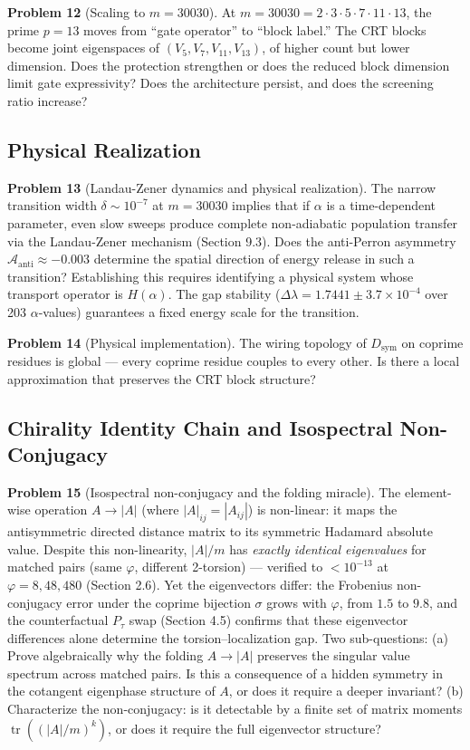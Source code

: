 \documentclass[11pt,letterpaper]{article}
\theoremstyle{definition}
\theoremstyle{remark}
\begin{document}
\textbf{Problem 12} (Scaling to $m = 30030$). At $m = 30030 = 2 \cdot 3 \cdot 5 \cdot 7 \cdot 11 \cdot 13$, the prime $p = 13$ moves from ``gate operator'' to ``block label.'' The CRT blocks become joint eigenspaces of $(V_5, V_7, V_{11}, V_{13})$, of higher count but lower dimension. Does the protection strengthen or does the reduced block dimension limit gate expressivity? Does the architecture persist, and does the screening ratio increase?

\subsection{Physical Realization}\label{physical-realization}

\textbf{Problem 13} (Landau-Zener dynamics and physical realization). The narrow transition width $\delta \sim 10^{-7}$ at $m = 30030$ implies that if $\alpha$ is a time-dependent parameter, even slow sweeps produce complete non-adiabatic population transfer via the Landau-Zener mechanism (Section 9.3). Does the anti-Perron asymmetry $\mathcal{A}_{\text{anti}} \approx -0.003$ determine the spatial direction of energy release in such a transition? Establishing this requires identifying a physical system whose transport operator is $H(\alpha)$. The gap stability ($\Delta\lambda = 1.7441 \pm 3.7 \times 10^{-4}$ over 203 $\alpha$-values) guarantees a fixed energy scale for the transition.

\textbf{Problem 14} (Physical implementation). The wiring topology of $D_{\text{sym}}$ on coprime residues is global --- every coprime residue couples to every other. Is there a local approximation that preserves the CRT block structure?

\subsection{Chirality Identity Chain and Isospectral Non-Conjugacy}\label{chirality-identity-chain-and-isospectral-non-conjugacy}

\textbf{Problem 15} (Isospectral non-conjugacy and the folding miracle). The element-wise operation $A \to |A|$ (where $|A|_{ij} = |A_{ij}|$) is non-linear: it maps the antisymmetric directed distance matrix to its symmetric Hadamard absolute value. Despite this non-linearity, $|A|/m$ has \emph{exactly identical eigenvalues} for matched pairs (same $\varphi$, different 2-torsion) --- verified to $< 10^{-13}$ at $\varphi = 8, 48, 480$ (Section 2.6). Yet the eigenvectors differ: the Frobenius non-conjugacy error under the coprime bijection $\sigma$ grows with $\varphi$, from $1.5$ to $9.8$, and the counterfactual $P_\tau$ swap (Section 4.5) confirms that these eigenvector differences alone determine the torsion--localization gap. Two sub-questions: (a) Prove algebraically why the folding $A \to |A|$ preserves the singular value spectrum across matched pairs. Is this a consequence of a hidden symmetry in the cotangent eigenphase structure of $A$, or does it require a deeper invariant? (b) Characterize the non-conjugacy: is it detectable by a finite set of matrix moments $\operatorname{tr}((|A|/m)^k)$, or does it require the full eigenvector structure?
\end{document}
